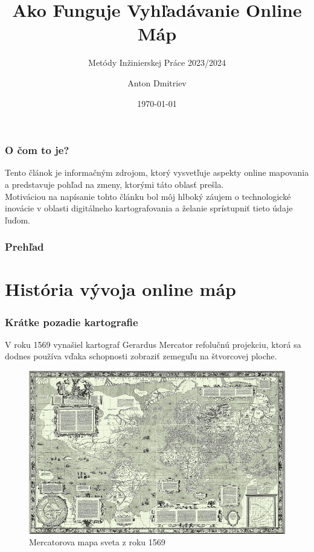 \documentclass{beamer}
\author{Anton Dmitriev}
\institute{Slovenská Technická Univerzita v Bratislave}
\title{Ako Funguje Vyhľadávanie Online Máp}
\subtitle{\vspace{3mm} Metódy Inžinierskej Práce 2023/2024}
\date{\today}
\begin{document}
\begin{frame}
\titlepage
\end{frame}


\begin{frame}[fragile=singleslide]\frametitle{O čom to je?}
Tento článok je informačným zdrojom, ktorý vysvetľuje aspekty online mapovania a predstavuje pohľad na zmeny, ktorými táto oblasť prešla.
\\Motiváciou na napísanie tohto článku bol môj hlboký záujem o technologické inovácie v oblasti digitálneho kartografovania a želanie sprístupniť tieto údaje ľuďom.
\end{frame}


\begin{frame}[fragile=singleslide]\frametitle{Prehľad}
\tableofcontents
\end{frame}


\section{História vývoja online máp}

\begin{frame}[fragile=singleslide]\frametitle{Krátke pozadie kartografie}
V roku 1569 vynašiel kartograf Gerardus Mercator refolučnú projekciu, ktorá sa dodnes používa vďaka schopnosti zobraziť zemeguľu na štvorcovej ploche.
\begin{figure}[h]
	\centering
	\includegraphics[scale=0.25]{image1.png}
	\caption{Mercatorova mapa sveta z roku 1569}
	\label{fig:mercator}
\end{figure}
\end{frame}
\end{document}
